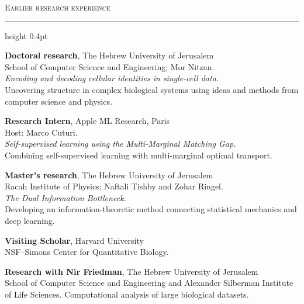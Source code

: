 \documentclass[11pt,letterpaper]{article}
\newcommand{\cvsection}[1]{%
  \par\addvspace{13pt}\Needspace{5\baselineskip}%
  {\large\scshape #1}\par\vspace{3pt}\hrule height 0.4pt\vspace{7pt}}
\newenvironment{dated}{\begin{description}[
  style=multiline,leftmargin=3.1cm,labelwidth=2.85cm,labelsep=.25cm,
  align=left,font=\normalfont\small,itemsep=5pt,parsep=0pt,topsep=0pt]}{\end{description}}
\newcommand{\entry}[2]{\Needspace{3\baselineskip}\item[{#1}]#2}
\begin{document}
\cvsection{Earlier research experience}
\begin{dated}
\entry{2020--2024}{\textbf{Doctoral research}, The Hebrew University of Jerusalem\\
School of Computer Science and Engineering; Mor Nitzan.\\
\textit{Encoding and decoding cellular identities in single-cell data.}\\
Uncovering structure in complex biological systems using ideas and methods from computer science and physics.}
\entry{May--Sep. 2023}{\textbf{Research Intern}, Apple ML Research, Paris\\
Host: Marco Cuturi.\\
\textit{Self-supervised learning using the Multi-Marginal Matching Gap.}\\
Combining self-supervised learning with multi-marginal optimal transport.}
\entry{2018--2020}{\textbf{Master's research}, The Hebrew University of Jerusalem\\
Racah Institute of Physics; Naftali Tishby and Zohar Ringel.\\
\textit{The Dual Information Bottleneck.}\\
Developing an information-theoretic method connecting statistical mechanics and deep learning.}
\entry{Oct. 2019}{\textbf{Visiting Scholar}, Harvard University\\
NSF--Simons Center for Quantitative Biology.}
\entry{2014--2017}{\textbf{Research with Nir Friedman}, The Hebrew University of Jerusalem\\
School of Computer Science and Engineering and Alexander Silberman Institute of Life Sciences. Computational analysis of large biological datasets.}
\end{dated}
\end{document}
